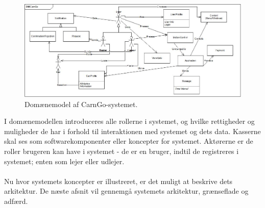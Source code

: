 \documentclass[Arkitektur/System_main.tex]{subfiles}
\begin{document}
\begin{figure}[H]
    \centering
    \includegraphics[width=1\textwidth]{Arkitektur/Softwarearkitektur/UserStoryArchitecture/graphics/DomainModel.jpg}
    \caption{Domænemodel af CarnGo-systemet.}
    \label{fig:domain}
\end{figure}
I domænemodellen introduceres alle rollerne i systemet, og hvilke rettigheder og muligheder de har i forhold til interaktionen med systemet og dets data. Kasserne skal ses som softwarekomponenter eller koncepter for systemet. Aktørerne er de roller brugeren kan have i systemet - de er en bruger, indtil de registreres i systemet; enten som lejer eller udlejer. \\\\
Nu hvor systemets koncepter er illustreret, er det muligt at beskrive dets arkitektur. De næste afsnit vil gennemgå systemets arkitektur, grænseflade og adfærd. 
\end{document}
